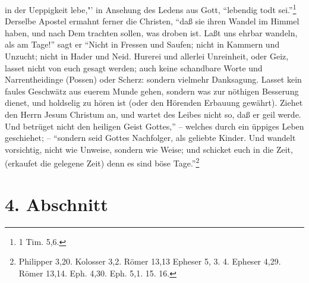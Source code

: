 in der Ueppigkeit lebe,"' in Ansehung des Ledens aus Gott, "`lebendig todt
sei."'\footnote{1 Tim. 5,6.} Derselbe Apostel ermahnt ferner die Christen,
"`daß sie ihren Wandel im Himmel haben, und nach Dem trachten sollen, was droben
ist. Laßt uns ehrbar wandeln, als am Tage!"' sagt er "`Nicht in Fressen und
Saufen; nicht in Kammern und Unzucht; nicht in Hader und Neid. Hurerei und
allerlei Unreinheit, oder Geiz, lasset nicht von euch gesagt werden; auch keine
schandbare Worte und Narrentheidinge (Possen) oder Scherz: sondern vielmehr
Danksagung. Lasset kein faules Geschwätz aus euerem Munde gehen, sondern was zur
nöthigen Besserung dienet, und holdselig zu hören ist (oder den Hörenden
Erbauung gewährt). Ziehet den Herrn Jesum Christum an, und wartet des Leibes
nicht so, daß er geil werde. Und betrüget nicht den heiligen Geist Gottes,"' --
welches durch ein üppiges Leben geschiehet; -- "`sondern seid Gottes Nachfolger,
als geliebte Kinder. Und wandelt vorsichtig, nicht wie Unweise, sondern wie
Weise; und schicket euch in die Zeit, (erkaufet die gelegene Zeit) denn es sind
böse Tage."'\footnote{Philipper 3,20.  Kolosser 3,2.  Römer 13,13  Epheser 5, 3.
4.  Epheser 4,29. Römer 13,14. Eph. 4,30. Eph. 5,1. 15. 16.}

\section{4. Abschnitt}

